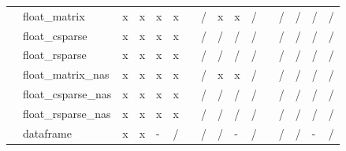 \documentclass{article}
\begin{document}
\begin{longtable}{llllllllllllllll}
                & float\_matrix             & \cellcolor[HTML]{B7E1CD}x & \cellcolor[HTML]{B7E1CD}x & \cellcolor[HTML]{B7E1CD}x & \cellcolor[HTML]{B7E1CD}x &  & \cellcolor[HTML]{F4CCCC}/ & \cellcolor[HTML]{B7E1CD}x & \cellcolor[HTML]{B7E1CD}x & \cellcolor[HTML]{F4CCCC}/ &  & \cellcolor[HTML]{F4CCCC}/ & \cellcolor[HTML]{F4CCCC}/ & \cellcolor[HTML]{F4CCCC}/ & \cellcolor[HTML]{F4CCCC}/ \\
                & float\_csparse            & \cellcolor[HTML]{B7E1CD}x & \cellcolor[HTML]{B7E1CD}x & \cellcolor[HTML]{B7E1CD}x & \cellcolor[HTML]{B7E1CD}x &  & \cellcolor[HTML]{F4CCCC}/ & \cellcolor[HTML]{F4CCCC}/ & \cellcolor[HTML]{F4CCCC}/ & \cellcolor[HTML]{F4CCCC}/ &  & \cellcolor[HTML]{F4CCCC}/ & \cellcolor[HTML]{F4CCCC}/ & \cellcolor[HTML]{F4CCCC}/ & \cellcolor[HTML]{F4CCCC}/ \\
                & float\_rsparse            & \cellcolor[HTML]{B7E1CD}x & \cellcolor[HTML]{B7E1CD}x & \cellcolor[HTML]{B7E1CD}x & \cellcolor[HTML]{B7E1CD}x &  & \cellcolor[HTML]{F4CCCC}/ & \cellcolor[HTML]{F4CCCC}/ & \cellcolor[HTML]{F4CCCC}/ & \cellcolor[HTML]{F4CCCC}/ &  & \cellcolor[HTML]{F4CCCC}/ & \cellcolor[HTML]{F4CCCC}/ & \cellcolor[HTML]{F4CCCC}/ & \cellcolor[HTML]{F4CCCC}/ \\
                & float\_matrix\_nas        & \cellcolor[HTML]{B7E1CD}x & \cellcolor[HTML]{B7E1CD}x & \cellcolor[HTML]{B7E1CD}x & \cellcolor[HTML]{B7E1CD}x &  & \cellcolor[HTML]{F4CCCC}/ & \cellcolor[HTML]{B7E1CD}x & \cellcolor[HTML]{B7E1CD}x & \cellcolor[HTML]{F4CCCC}/ &  & \cellcolor[HTML]{F4CCCC}/ & \cellcolor[HTML]{F4CCCC}/ & \cellcolor[HTML]{F4CCCC}/ & \cellcolor[HTML]{F4CCCC}/ \\
                & float\_csparse\_nas       & \cellcolor[HTML]{B7E1CD}x & \cellcolor[HTML]{B7E1CD}x & \cellcolor[HTML]{B7E1CD}x & \cellcolor[HTML]{B7E1CD}x &  & \cellcolor[HTML]{F4CCCC}/ & \cellcolor[HTML]{F4CCCC}/ & \cellcolor[HTML]{F4CCCC}/ & \cellcolor[HTML]{F4CCCC}/ &  & \cellcolor[HTML]{F4CCCC}/ & \cellcolor[HTML]{F4CCCC}/ & \cellcolor[HTML]{F4CCCC}/ & \cellcolor[HTML]{F4CCCC}/ \\
                & float\_rsparse\_nas       & \cellcolor[HTML]{B7E1CD}x & \cellcolor[HTML]{B7E1CD}x & \cellcolor[HTML]{B7E1CD}x & \cellcolor[HTML]{B7E1CD}x &  & \cellcolor[HTML]{F4CCCC}/ & \cellcolor[HTML]{F4CCCC}/ & \cellcolor[HTML]{F4CCCC}/ & \cellcolor[HTML]{F4CCCC}/ &  & \cellcolor[HTML]{F4CCCC}/ & \cellcolor[HTML]{F4CCCC}/ & \cellcolor[HTML]{F4CCCC}/ & \cellcolor[HTML]{F4CCCC}/ \\
                & dataframe                 & \cellcolor[HTML]{B7E1CD}x & \cellcolor[HTML]{B7E1CD}x & \cellcolor[HTML]{CFE2F3}- & \cellcolor[HTML]{F4CCCC}/ &  & \cellcolor[HTML]{F4CCCC}/ & \cellcolor[HTML]{F4CCCC}/ & \cellcolor[HTML]{CFE2F3}- & \cellcolor[HTML]{F4CCCC}/ &  & \cellcolor[HTML]{F4CCCC}/ & \cellcolor[HTML]{F4CCCC}/ & \cellcolor[HTML]{CFE2F3}- & \cellcolor[HTML]{F4CCCC}/ \\

\end{longtable}
\end{document}
